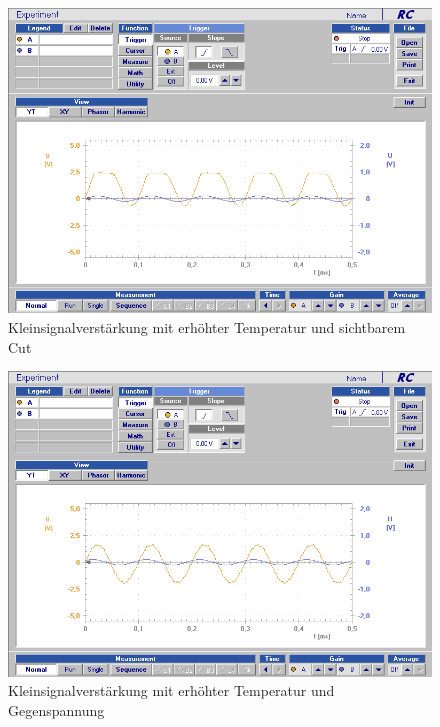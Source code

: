 \documentclass[12pt,a4paper]{article}
\begin{document}
\begin{figure}[H]
	\centering
	\includegraphics[scale=0.5]{./data/Braun_Kurz_PS8/Kleinsignalverstaerkung_Temp_Cut.png}
	\caption{Kleinsignalverstärkung mit erhöhter Temperatur und sichtbarem Cut}
	\label{fig:kleinsignalverstaerkung_temp_cut}
\end{figure}

\begin{figure}[H]
	\centering
	\includegraphics[scale=0.5]{./data/Braun_Kurz_PS8/Kleinsignalverstaerkung_Temp_Gegenspannung.png}
	\caption{Kleinsignalverstärkung mit erhöhter Temperatur und Gegenspannung}
	\label{fig:kleinsignalverstaerkung_temp_gegen}
\end{figure}
\end{document}
